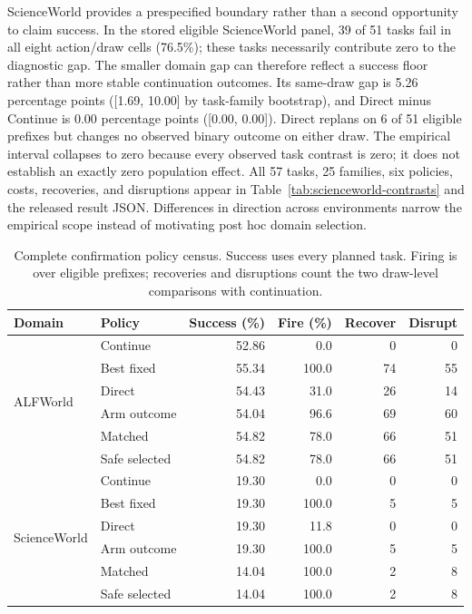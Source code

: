 ScienceWorld provides a prespecified boundary rather than a second opportunity to claim success. In the stored eligible ScienceWorld panel, 39 of 51 tasks fail in all eight action/draw cells (76.5\%); these tasks necessarily contribute zero to the diagnostic gap. The smaller domain gap can therefore reflect a success floor rather than more stable continuation outcomes. Its same-draw gap is 5.26 percentage points ([1.69, 10.00] by task-family bootstrap), and Direct minus Continue is 0.00 percentage points ([0.00, 0.00]). Direct replans on 6 of 51 eligible prefixes but changes no observed binary outcome on either draw. The empirical interval collapses to zero because every observed task contrast is zero; it does not establish an exactly zero population effect. All 57 tasks, 25 families, six policies, costs, recoveries, and disruptions appear in Table~\ref{tab:scienceworld-contrasts} and the released result JSON. Differences in direction across environments narrow the empirical scope instead of motivating post hoc domain selection.


\begin{table}[ht]
\caption{Complete confirmation policy census. Success uses every planned task. Firing is over eligible prefixes; recoveries and disruptions count the two draw-level comparisons with continuation.}
\label{tab:confirmation-policies}
\centering
\small
\begin{tabular}{@{}llrrrr@{}}
\toprule
Domain & Policy & Success (\%) & Fire (\%) & Recover & Disrupt \\
\midrule
\multirow{6}{*}{ALFWorld} & Continue & 52.86 & 0.0 & 0 & 0 \\
 & Best fixed & 55.34 & 100.0 & 74 & 55 \\
 & Direct & 54.43 & 31.0 & 26 & 14 \\
 & Arm outcome & 54.04 & 96.6 & 69 & 60 \\
 & Matched & 54.82 & 78.0 & 66 & 51 \\
 & Safe selected & 54.82 & 78.0 & 66 & 51 \\
\midrule
\multirow{6}{*}{ScienceWorld} & Continue & 19.30 & 0.0 & 0 & 0 \\
 & Best fixed & 19.30 & 100.0 & 5 & 5 \\
 & Direct & 19.30 & 11.8 & 0 & 0 \\
 & Arm outcome & 19.30 & 100.0 & 5 & 5 \\
 & Matched & 14.04 & 100.0 & 2 & 8 \\
 & Safe selected & 14.04 & 100.0 & 2 & 8 \\
\bottomrule
\end{tabular}
\end{table}

